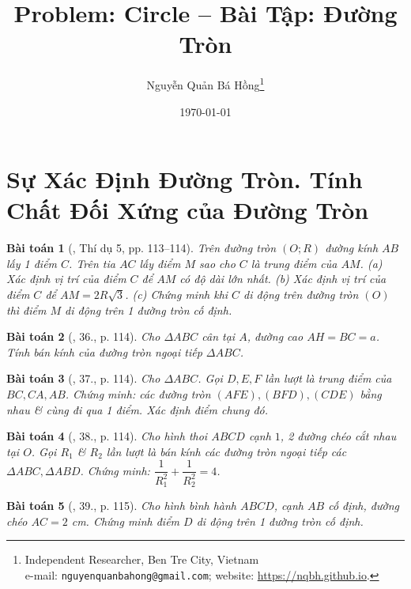 \documentclass{article}
\title{Problem: Circle -- Bài Tập: Đường Tròn}
\author{Nguyễn Quản Bá Hồng\footnote{Independent Researcher, Ben Tre City, Vietnam\\e-mail: \texttt{nguyenquanbahong@gmail.com}; website: \url{https://nqbh.github.io}.}}
\date{\today}
\newtheorem{baitoan}{Bài toán}
\begin{document}
\maketitle
\begin{abstract}
	
\end{abstract}
\tableofcontents


\section{Sự Xác Định Đường Tròn. Tính Chất Đối Xứng của Đường Tròn}

\begin{baitoan}[\cite{Tuyen_Toan_9}, Thí dụ 5, pp. 113--114]
	Trên đường tròn $(O;R)$ đường kính $AB$ lấy 1 điểm $C$. Trên tia $AC$ lấy điểm $M$ sao cho $C$ là trung điểm của $AM$. (a) Xác định vị trí của điểm $C$ để $AM$ có độ dài lớn nhất. (b) Xác định vị trí của điểm $C$ để $AM = 2R\sqrt{3}$. (c) Chứng minh khi $C$ di động trên đường tròn $(O)$ thì điểm $M$ di động trên 1 đường tròn cố định.
\end{baitoan}

\begin{baitoan}[\cite{Tuyen_Toan_9}, 36., p. 114]
	Cho $\Delta ABC$ cân tại $A$, đường cao $AH = BC = a$. Tính bán kính của đường tròn ngoại tiếp $\Delta ABC$.
\end{baitoan}

\begin{baitoan}[\cite{Tuyen_Toan_9}, 37., p. 114]
	Cho $\Delta ABC$. Gọi $D,E,F$ lần lượt là trung điểm của $BC,CA,AB$. Chứng minh: các đường tròn $(AFE),(BFD),(CDE)$ bằng nhau \& cùng đi qua 1 điểm. Xác định điểm chung đó.
\end{baitoan}

\begin{baitoan}[\cite{Tuyen_Toan_9}, 38., p. 114]
	Cho hình thoi $ABCD$ cạnh $1$, 2 đường chéo cắt nhau tại $O$. Gọi $R_1$ \& $R_2$ lần lượt là bán kính các đường tròn ngoại tiếp các $\Delta ABC,\Delta ABD$. Chứng minh: $\dfrac{1}{R_1^2} + \dfrac{1}{R_2^2} = 4$.
\end{baitoan}

\begin{baitoan}[\cite{Tuyen_Toan_9}, 39., p. 115]
	Cho hình bình hành $ABCD$, cạnh $AB$ cố định, đường chéo $AC = 2$ \emph{cm}. Chứng minh điểm $D$ di động trên 1 đường tròn cố định.
\end{baitoan}
\end{document}
